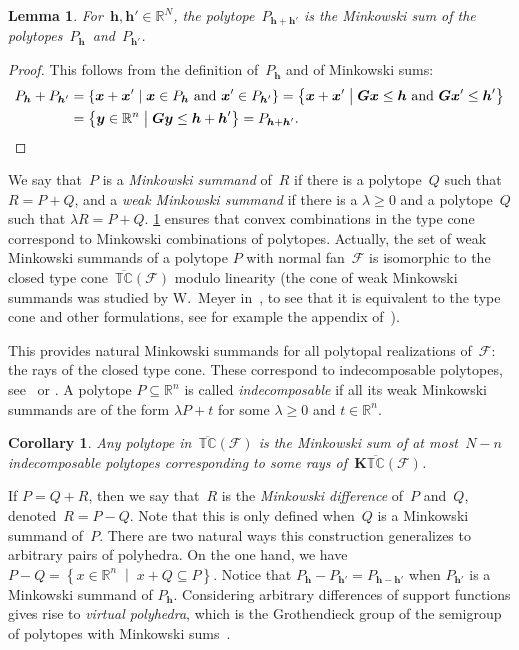 \documentclass{amsart}
\newtheorem{corollary}[theorem]{Corollary}
\newtheorem{lemma}[theorem]{Lemma}
\theoremstyle{definition}
\newcommand{\R}{\mathbb{R}} %
\renewcommand{\b}[1]{{\boldsymbol{#1}}} %
\newcommand{\set}[2]{\left\{ #1 \;\middle|\; #2 \right\}} %
\newcommand{\darkblue}{\color{darkblue}} %
\newcommand{\defn}[1]{\textsl{\darkblue #1}} %
\newcommand{\Fan}{\mathcal{F}} %
\newcommand{\ctypeCone}{\overline{\mathbb{TC}}} %
\begin{document}
\begin{lemma}
\label{lem:MinkowskiSum}
For~$\b{h}, \b{h}' \! \in \R^N$, the polytope~$P_{\b{h} + \b{h'}}$ is the Minkowski sum of the polytopes~$P_\b{h}$~and~$P_{\b{h}'}$.
\end{lemma}

\begin{proof}
This follows from the definition of~$P_\b{h}$ and of Minkowski sums:
\begin{align*}
P_\b{h} + P_{\b{h}'} & = \set{\b{x} + \b{x}'}{\b{x} \in P_\b{h} \text{ and } \b{x}' \in P_{\b{h}'}} = \set{\b{x} + \b{x}'}{\b{G}\b{x} \le \b{h} \text{ and } \b{G}\b{x}' \le \b{h}'} \\
& = \set{\b{y} \in \R^n}{\b{G}\b{y} \le \b{h} + \b{h}'} = P_{\b{h} + \b{h}'}.
\qedhere
\end{align*}
\end{proof}

We say that~$P$ is a \defn{Minkowski summand} of~$R$ if there is a polytope~$Q$ such that $R=P+Q$, and a \defn{weak Minkowski summand} if there is a $\lambda \ge 0$ and a polytope~$Q$ such that ${\lambda R = P + Q}$. 
\cref{lem:MinkowskiSum} ensures that convex combinations in the type cone correspond to Minkowski combinations of polytopes. Actually, the set of weak Minkowski summands of a polytope $P$ with normal fan~$\Fan$ is isomorphic to the closed type cone~$\ctypeCone(\Fan)$ modulo linearity (the cone of weak Minkowski summands was studied by W.~Meyer in~\cite{Meyer}, to see that it is equivalent to the type cone and other formulations, see for example the appendix of~\cite{PostnikovReinerWilliams}).

This provides natural Minkowski summands for all polytopal realizations of~$\Fan$: the rays of the closed type cone. These correspond to indecomposable polytopes, see~\cite{Meyer} or \cite{McMullen-typeCone}. A polytope $P \subseteq \R^n$ is called \defn{indecomposable} if all its weak Minkowski summands are of the form $\lambda P+t$ for some $\lambda \ge 0$ and $t \in \R^n$.

\begin{corollary}
Any polytope in~$\ctypeCone(\Fan)$ is the Minkowski sum of at most~$N-n$ indecomposable polytopes corresponding to some rays of~$\b{K}\ctypeCone(\Fan)$.
\end{corollary}

If $P = Q + R$, then we say that~$R$ is the \defn{Minkowski difference} of~$P$ and~$Q$, denoted~${R = P - Q}$. Note that this is only defined when~$Q$ is a Minkowski summand of~$P$.
There are two natural ways this construction generalizes to arbitrary pairs of polyhedra. On the one hand, we have $P - Q = \set{x \in \R^n}{x + Q \subseteq P}$. 
Notice that $P_\b{h} - P_{\b{h}'} = P_{\b{h} - \b{h'}}$ when $P_{\b{h}'}$ is a Minkowski summand of $P_\b{h}$. Considering arbitrary differences of support functions gives rise to \defn{virtual polyhedra}, which is the Grothendieck group of the semigroup of polytopes with Minkowski sums~\cite{PukhlikovKhovanskii}.
\end{document}
